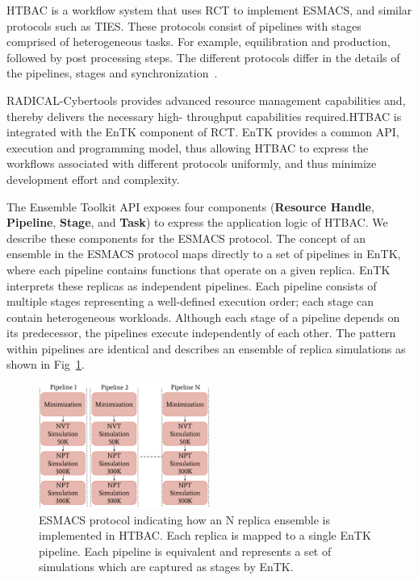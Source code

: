 
HTBAC is a workflow system that uses RCT to implement ESMACS, and similar
protocols such as TIES\@. These protocols consist of pipelines with stages
comprised of heterogeneous tasks. For example, equilibration and production,
followed by post processing steps. The different protocols differ in the details of the pipelines, stages and
synchronization~\cite{Bhati2017}.


RADICAL-Cybertools provides advanced resource management capabilities and,
thereby delivers the necessary high- throughput capabilities required.HTBAC is
integrated with the EnTK component of RCT. EnTK provides a common API,
execution and programming model, thus allowing HTBAC to express the workflows
associated with different protocols uniformly, and thus minimize development
effort and complexity.

The Ensemble Toolkit API exposes four components (\textbf{Resource Handle},
\textbf{Pipeline}, \textbf{Stage}, and \textbf{Task}) to express the
application logic of HTBAC\@. We describe these components for the ESMACS
protocol\@. The concept of an ensemble in the ESMACS protocol maps directly to 
a set of pipelines in EnTK, where each pipeline contains functions that operate 
on a given replica. EnTK interprets these replicas as independent pipelines. 
Each pipeline consists of multiple stages representing a well-defined execution 
order; each stage can contain heterogeneous workloads. Although each stage of a 
pipeline depends on its predecessor, the pipelines execute independently of each 
other. The pattern within pipelines are identical and describes an ensemble of replica
simulations as shown in Fig~\ref{figure:ESMACS-pipelines}.


\begin{figure}
\centering
  \includegraphics[width=0.5\textwidth]{FIGURES/HT-BAC_NAMD_pipelines_control_flow_only.pdf}
  \caption{ESMACS protocol indicating how an N replica ensemble is implemented in HTBAC.
  Each replica is mapped to a single EnTK pipeline. 
  Each pipeline is equivalent and represents a set of simulations which are captured as stages by
  EnTK.}\label{figure:ESMACS-pipelines}
\end{figure}

